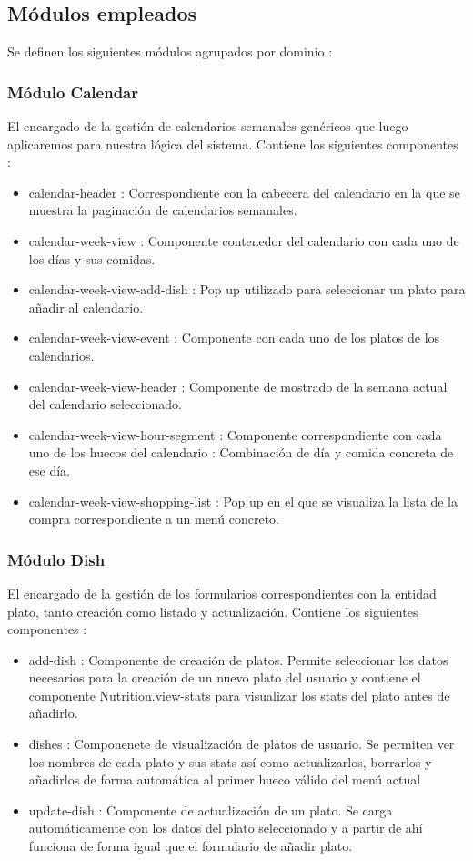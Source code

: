 \documentclass[12pt, a4paper, twoside]{book}
\begin{document}
	\subsection{Módulos empleados}
	
	Se definen los siguientes módulos agrupados por dominio : 
	
	\subsubsection{Módulo Calendar}
	El encargado de la gestión de calendarios semanales genéricos que luego aplicaremos para nuestra lógica del sistema. Contiene los siguientes componentes : 
	\begin{itemize}
		\item calendar-header : Correspondiente con la cabecera del calendario en la que se muestra la paginación de calendarios semanales.
		\item calendar-week-view : Componente contenedor del calendario con cada uno de los días y sus comidas.
		\item calendar-week-view-add-dish : Pop up utilizado para seleccionar un plato para añadir al calendario.
		\item calendar-week-view-event : Componente con cada uno de los platos de los calendarios.
		\item calendar-week-view-header : Componente de mostrado de la semana actual del calendario seleccionado.
		\item calendar-week-view-hour-segment : Componente correspondiente con cada uno de los huecos del calendario : Combinación de día y comida concreta de ese día.
		\item calendar-week-view-shopping-list : Pop up en el que se visualiza la lista de la compra correspondiente a un menú concreto.
	\end{itemize}
	\subsubsection{Módulo Dish}
	El encargado de la gestión de los formularios correspondientes con la entidad plato, tanto creación como listado y actualización. Contiene los siguientes componentes : 
	\begin{itemize}
		\item add-dish : Componente de creación de platos. Permite seleccionar los datos necesarios para la creación de un nuevo plato del usuario y contiene el componente Nutrition.view-stats para visualizar los stats del plato antes de añadirlo.
		\item dishes : Componenete de visualización de platos de usuario. Se permiten ver los nombres de cada plato y sus stats así como actualizarlos, borrarlos y añadirlos de forma automática al primer hueco válido del menú actual
		\item update-dish : Componente de actualización de un plato. Se carga automáticamente con los datos del plato seleccionado y a partir de ahí funciona de forma igual que el formulario de añadir plato.		
	\end{itemize}
\end{document}
